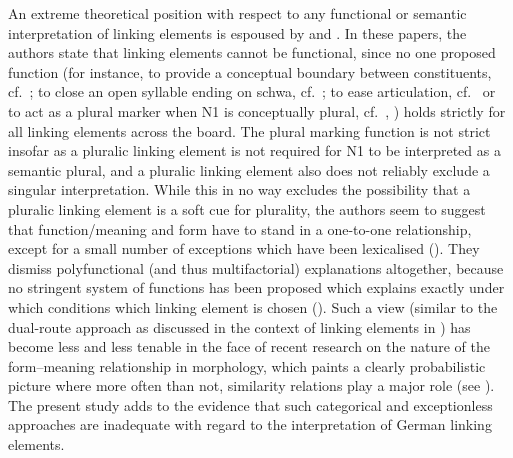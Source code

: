 An extreme theoretical position with respect to any functional or semantic interpretation of linking elements is espoused by \textcite{NeefBorgwaldt2012} and \textcite{Neef2015}.
In these papers, the authors state that linking elements cannot be functional, since no one proposed function (for instance, to provide a conceptual boundary between constituents, cf.\ \citealt[530]{Fuhrhop1996}; to close an open syllable ending on schwa, cf.\ \citealt[446]{Wegner2003}; to ease articulation, cf.\ \citealt[177]{Wegener2005} or to act as a plural marker when N1 is conceptually plural, cf.\ \citealt[534]{Fuhrhop1996}, \citealt[427]{Wegner2003}) holds strictly for all linking elements across the board. 
The plural marking function is not strict insofar as a pluralic linking element is not required for N1 to be interpreted as a semantic plural, and a pluralic linking element also does not reliably exclude a singular interpretation.
While this in no way excludes the possibility that a pluralic linking element is a soft cue for plurality, the authors seem to suggest that function\slash meaning and form have to stand in a one-to-one relationship, except for a small number of exceptions which have been lexicalised (\egg \citealt[42]{NeefBorgwaldt2012}).
They dismiss polyfunctional (and thus multifactorial) explanations altogether, because no stringent system of functions has been proposed which explains exactly under which conditions which linking element is chosen (\egg \citealt[27--29]{NeefBorgwaldt2012}).
Such a view (similar to the dual-route approach as discussed in the context of linking elements in \citealt{KrottEa2007}) has become less and less tenable in the face of recent research on the nature of the form--meaning relationship in morphology, which paints a clearly probabilistic picture where more often than not, similarity relations play a major role (see \citealt[107]{ArndtlappeEa2016}).
The present study adds to the evidence that such categorical and exceptionless approaches are inadequate with regard to the interpretation of German linking elements.


